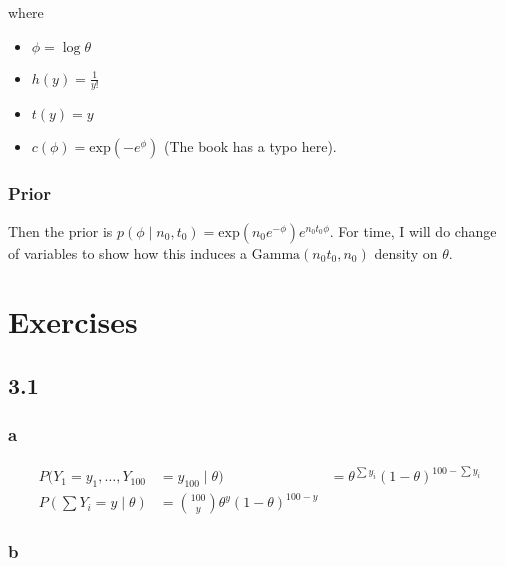 \documentclass[
]{article}
\providecommand{\tightlist}{%
  \setlength{\itemsep}{0pt}\setlength{\parskip}{0pt}}
\begin{document}
where

\begin{itemize}
\tightlist
\item
  \(\phi = \log \theta\)
\item
  \(h(y) = \frac{1}{y!}\)
\item
  \(t(y) = y\)
\item
  \(c(\phi) = \text{exp}(-e^\phi)\) (The book has a typo here).
\end{itemize}

\hypertarget{prior-1}{%
\subsubsection{Prior}\label{prior-1}}

Then the prior is
\(p(\phi \mid n_0, t_0) = \text{exp}(n_0 e^{-\phi}) e^{n_0 t_0 \phi}\).
For time, I will do change of variables to show how this induces a
\(\text{Gamma}(n_0 t_0, n_0)\) density on \(\theta\).

\hypertarget{exercises}{%
\section{Exercises}\label{exercises}}

\hypertarget{section}{%
\subsection{3.1}\label{section}}

\hypertarget{a}{%
\subsubsection{a}\label{a}}

\begin{align}
P(Y_1 = y_1, \dots, Y_{100} &= y_100 \mid \theta) &= \theta^{\sum y_i} (1 - \theta)^{100 - \sum y_i} \\
P(\sum Y_i = y \mid \theta) &= {100 \choose y} \theta^{y}(1 - \theta)^{100 - y}
\end{align}

\hypertarget{b}{%
\subsubsection{b}\label{b}}
\end{document}

